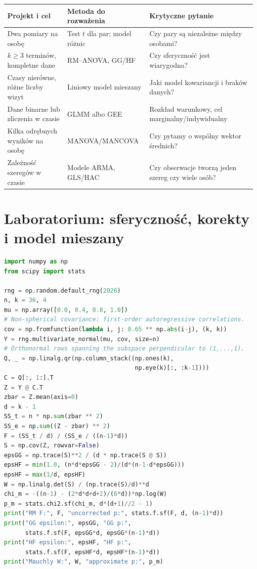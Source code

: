 \documentclass[11pt,a4paper,oneside]{report}
\numberwithin{equation}{chapter}
\theoremstyle{plain}
\theoremstyle{definition}
\theoremstyle{remark}
\begin{document}
\begin{center}\small
\begin{tabular}{>{\raggedright\arraybackslash}p{}>{\raggedright\arraybackslash}p{}>{\raggedright\arraybackslash}p{}}
\toprule
\textbf{Projekt i cel} & \textbf{Metoda do rozważenia} & \textbf{Krytyczne pytanie}\\
\midrule
Dwa pomiary na osobę & Test $t$ dla par; model różnic & Czy pary są niezależne między osobami?\\
$k\ge3$ terminów, kompletne dane & RM--ANOVA, GG/HF & Czy sferyczność jest wiarygodna?\\
Czasy nierówne, różne liczby wizyt & Liniowy model mieszany & Jaki model kowariancji i braków danych?\\
Dane binarne lub zliczenia w czasie & GLMM albo GEE & Rozkład warunkowy, cel marginalny/indywidualny\\
Kilka odrębnych wyników na osobę & MANOVA/MANCOVA & Czy pytamy o wspólny wektor średnich?\\
Zależność szeregów w czasie & Modele ARMA, GLS/HAC & Czy obserwacje tworzą jeden szereg czy wiele osób?\\
\bottomrule
\end{tabular}
\end{center}

\section{Laboratorium: sferyczność, korekty i model mieszany}
\begin{lstlisting}[language=Python,caption={Kompletny program: RM--ANOVA, współczynniki GG/HF i przybliżenie testu Mauchly'ego (Python, NumPy, SciPy).}]
import numpy as np
from scipy import stats

rng = np.random.default_rng(2026)
n, k = 36, 4
mu = np.array([0.0, 0.4, 0.8, 1.0])
# Non-spherical covariance: first-order autoregressive correlations.
cov = np.fromfunction(lambda i, j: 0.65 ** np.abs(i-j), (k, k))
Y = rng.multivariate_normal(mu, cov, size=n)
# Orthonormal rows spanning the subspace perpendicular to (1,...,1).
Q, _ = np.linalg.qr(np.column_stack((np.ones(k),
                                     np.eye(k)[:, :k-1])))
C = Q[:, 1:].T
Z = Y @ C.T
zbar = Z.mean(axis=0)
d = k - 1
SS_t = n * np.sum(zbar ** 2)
SS_e = np.sum((Z - zbar) ** 2)
F = (SS_t / d) / (SS_e / ((n-1)*d))
S = np.cov(Z, rowvar=False)
epsGG = np.trace(S)**2 / (d * np.trace(S @ S))
epsHF = min(1.0, (n*d*epsGG - 2)/(d*(n-1-d*epsGG)))
epsHF = max(1/d, epsHF)
W = np.linalg.det(S) / (np.trace(S)/d)**d
chi_m = -((n-1) - (2*d*d+d+2)/(6*d))*np.log(W)
p_m = stats.chi2.sf(chi_m, d*(d+1)//2 - 1)
print("RM F:", F, "uncorrected p:", stats.f.sf(F, d, (n-1)*d))
print("GG epsilon:", epsGG, "GG p:",
      stats.f.sf(F, epsGG*d, epsGG*(n-1)*d))
print("HF epsilon:", epsHF, "HF p:",
      stats.f.sf(F, epsHF*d, epsHF*(n-1)*d))
print("Mauchly W:", W, "approximate p:", p_m)
\end{lstlisting}
\end{document}
